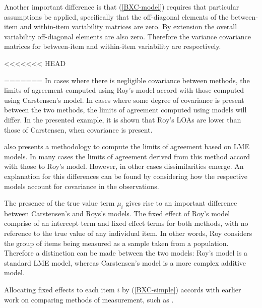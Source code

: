 \documentclass[12pt, a4paper]{report}
\theoremstyle{plain}
\theoremstyle{definition}
\theoremstyle{remark}
\begin{document}
Another important difference is that (\ref{BXC-model}) requires that particular assumptions be applied, specifically that the off-diagonal elements of the between-item and within-item variability matrices are zero. By extension the
overall variability off-diagonal elements are also zero. Therefore the variance covariance matrices for between-item and within-item variability are respectively.

<<<<<<< HEAD
	
 
=======
In cases where there is negligible covariance between methods, the limits of agreement computed using Roy's model accord with those computed using Carstensen's model. In cases where some degree of
covariance is present between the two methods, the limits of agreement computed using models will differ. In the presented
example, it is shown that Roy's LOAs are lower than those of Carstensen, when covariance is present.

\citet{BXC2008} also presents a methodology to compute the limits of agreement based on LME models. In many cases the limits of agreement derived from this method accord with those to Roy's model. However, in other cases dissimilarities emerge. An explanation for this differences can be found by considering how the respective models account for covariance in the observations.

The presence of the true value term $\mu_i$ gives rise to an important difference between Carstensen's and Roys's models. The fixed effect of Roy's model comprise of an intercept term and fixed effect terms for both methods, with no reference to the true value of any individual item. In other words, Roy considers the group of items being measured as a sample taken from a population. Therefore a distinction can be made between the two models: Roy's model is a standard LME model, whereas Carstensen's model is a more complex additive model.


Allocating fixed effects to each item $i$ by (\ref{BXC-simple}) accords with earlier work on comparing methods of measurement, such as \citet{Grubbs48}.
\end{document}
